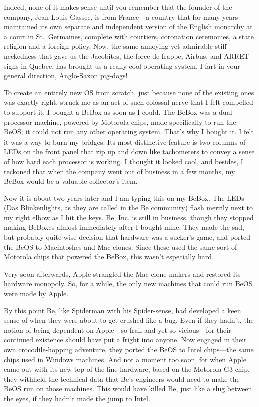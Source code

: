 \documentclass[
  fontsize=11pt,
  paper=landscape,
  twocolumn=true,
  pagesize=pdftex,
  headings=small,
  DIV=15,
  ]{scrartcl}
\begin{document}
Indeed, none of it makes sense until you remember that the founder of
the company, Jean-Louis Gassee, is from France---a country that for many
years maintained its own separate and independent version of the English
monarchy at a court in St.~Germaines, complete with courtiers,
coronation ceremonies, a state religion and a foreign policy. Now, the
same annoying yet admirable stiff-neckedness that gave us the Jacobites,
the force de frappe, Airbus, and ARRET signs in Quebec, has brought us a
really cool operating system. I fart in your general direction,
Anglo-Saxon pig-dogs!

To create an entirely new OS from scratch, just because none of the
existing ones was exactly right, struck me as an act of such colossal
nerve that I felt compelled to support it. I bought a BeBox as soon as I
could. The BeBox was a dual-processor machine, powered by Motorola
chips, made specifically to run the BeOS; it could not run any other
operating system. That's why I bought it. I felt it was a way to burn my
bridges. Its most distinctive feature is two columns of LEDs on the
front panel that zip up and down like tachometers to convey a sense of
how hard each processor is working. I thought it looked cool, and
besides, I reckoned that when the company went out of business in a few
months, my BeBox would be a valuable collector's item.

Now it is about two years later and I am typing this on my BeBox. The
LEDs (Das Blinkenlights, as they are called in the Be community) flash
merrily next to my right elbow as I hit the keys. Be, Inc. is still in
business, though they stopped making BeBoxes almost immediately after I
bought mine. They made the sad, but probably quite wise decision that
hardware was a sucker's game, and ported the BeOS to Macintoshes and Mac
clones. Since these used the same sort of Motorola chips that powered
the BeBox, this wasn't especially hard.

Very soon afterwards, Apple strangled the Mac-clone makers and restored
its hardware monopoly. So, for a while, the only new machines that could
run BeOS were made by Apple.

By this point Be, like Spiderman with his Spider-sense, had developed a
keen sense of when they were about to get crushed like a bug. Even if
they hadn't, the notion of being dependent on Apple---so frail and yet
so vicious---for their continued existence should have put a fright into
anyone. Now engaged in their own crocodile-hopping adventure, they
ported the BeOS to Intel chips---the same chips used in Windows
machines. And not a moment too soon, for when Apple came out with its
new top-of-the-line hardware, based on the Motorola G3 chip, they
withheld the technical data that Be's engineers would need to make the
BeOS run on those machines. This would have killed Be, just like a slug
between the eyes, if they hadn't made the jump to Intel.
\end{document}
